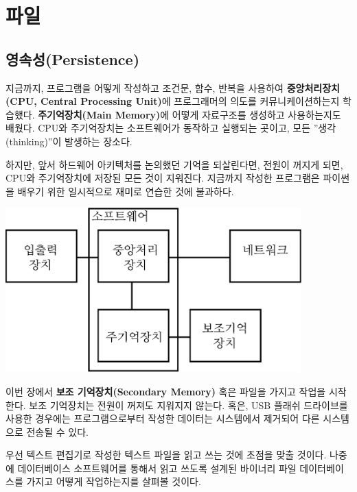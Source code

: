 
\chapter{파일}



\section{영속성(Persistence)}


지금까지, 프로그램을 어떻게 작성하고 조건문, 함수, 반복을 사용하여 
{\bf 중앙처리장치(CPU, Central Processing Unit)}에 프로그래머의 의도를 커뮤니케이션하는지 학습했다.
{\bf 주기억장치(Main Memory)}에 어떻게 자료구조를 생성하고 사용하는지도 배웠다.
CPU와 주기억장치는 소프트웨어가 동작하고 실행되는 곳이고, 모든 ''생각(thinking)''이 발생하는 장소다.

하지만, 앞서 하드웨어 아키텍처를 논의했던 기억을 되살린다면,
전원이 꺼지게 되면, CPU와 주기억장치에 저장된 모든 것이 지워진다.
지금까지 작성한 프로그램은 파이썬을 배우기 위한 일시적으로 재미로 연습한 것에 불과하다.

\beforefig
\centerline{\includegraphics[height=2.50in]{figs2/arch3.eps}}
\afterfig

이번 장에서 {\bf 보조 기억장치(Secondary Memory)} 혹은 파일을 가지고 작업을 시작한다.
보조 기억장치는 전원이 꺼져도 지워지지 않는다.
혹은, USB 플래쉬 드라이브를 사용한 경우에는 프로그램으로부터 작성한 데이터는 시스템에서 제거되어 다른 시스템으로 전송될 수 있다.

우선 텍스트 편집기로 작성한 텍스트 파일을 읽고 쓰는 것에 초점을 맞출 것이다.
나중에 데이터베이스 소프트웨어를 통해서 읽고 쓰도록 설계된 바이너리 파일 데이터베이스를 가지고 어떻게 작업하는지를 살펴볼 것이다.

